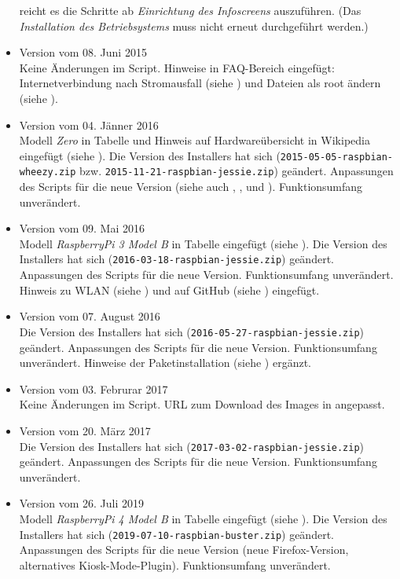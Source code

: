 \begin{itemize}
{		reicht es die Schritte ab  \textit{Einrichtung des Infoscreens} auszuführen.
		(Das  \textit{Installation des Betriebsystems} muss nicht erneut durchgeführt werden.)
		}
	\item {Version vom 08. Juni 2015\\ Keine Änderungen im Script.
		Hinweise in FAQ-Bereich eingefügt: Internetverbindung nach Stromausfall (siehe ) und Dateien als root ändern (siehe ).
 		}
	\item {Version vom 04. Jänner 2016\\ 
		Modell \textit{Zero} in Tabelle und Hinweis auf Hardwareübersicht in Wikipedia eingefügt (siehe ).
		Die Version des Installers hat sich (\lstinline|2015-05-05-raspbian-wheezy.zip| bzw. \lstinline|2015-11-21-raspbian-jessie.zip|) geändert. 
		Anpassungen des Scripts für die neue Version (siehe auch , ,  und ).
		Funktionsumfang unverändert.
 		}
	\item {Version vom 09. Mai 2016\\ 
		Modell \textit{RaspberryPi 3 Model B} in Tabelle eingefügt (siehe ).
		Die Version des Installers hat sich (\lstinline|2016-03-18-raspbian-jessie.zip|) geändert. 
		Anpassungen des Scripts für die neue Version.
		Funktionsumfang unverändert.
		Hinweis zu WLAN (siehe ) und auf GitHub (siehe ) eingefügt.
 		}
	\item {Version vom 07. August 2016\\ 
		Die Version des Installers hat sich (\lstinline|2016-05-27-raspbian-jessie.zip|) geändert. 
		Anpassungen des Scripts für die neue Version.
		Funktionsumfang unverändert.
		Hinweise der Paketinstallation (siehe ) ergänzt.
 		}
	\item {Version vom 03. Februrar 2017\\ Keine Änderungen im Script.
		URL zum Download des Images in  angepasst.
 		}
	\item {Version vom 20. März 2017\\ 
		Die Version des Installers hat sich (\lstinline|2017-03-02-raspbian-jessie.zip|) geändert. 
		Anpassungen des Scripts für die neue Version.
		Funktionsumfang unverändert.
 		}
	\item {Version vom 26. Juli 2019\\ 
		Modell \textit{RaspberryPi 4 Model B} in Tabelle eingefügt (siehe ).
		Die Version des Installers hat sich (\lstinline|2019-07-10-raspbian-buster.zip|) geändert. 
		Anpassungen des Scripts für die neue Version (neue Firefox-Version, alternatives Kiosk-Mode-Plugin).
		Funktionsumfang unverändert.
 		}
\end{itemize}

